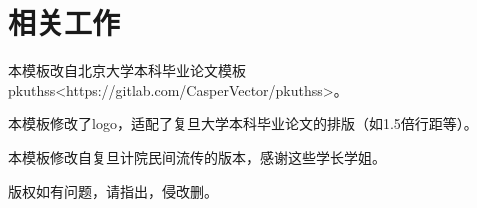 \chapter{相关工作}\label{chap2}

本模板改自北京大学本科毕业论文模板pkuthss<https://gitlab.com/CasperVector/pkuthss>。

本模板修改了logo，适配了复旦大学本科毕业论文的排版（如1.5倍行距等）。

本模板修改自复旦计院民间流传的版本，感谢这些学长学姐。

版权如有问题，请指出，侵改删。

